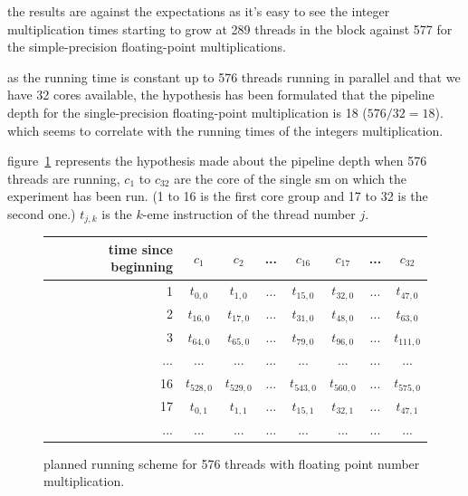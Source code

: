 \documentclass{report}
\begin{document}
    the results are against the expectations as it's easy to see the integer
    multiplication times starting to grow at 289 threads in the block against
    577 for the simple-precision floating-point multiplications.
    
    as the running time is constant up to 576 threads running in parallel and that we have 32 cores
    available, the hypothesis has been formulated that the pipeline depth for the single-precision 
    floating-point multiplication is 18 ($576/32 = 18$). which seems to correlate with the running
    times of the integers multiplication. 
    
    figure~\ref{fig:fp_prediction_512}
    represents the hypothesis made about the pipeline depth when 576 threads are running, $c_1$ to
    $c_{32}$ are the core of the single sm on which the experiment has been run. (1 to 16 is the
    first core group and 17 to 32 is the second one.) $t_{j,k}$ is the $k$-eme instruction of the thread number $j$. 
        \begin{figure}[h]
      \centering
       \begin{tabular}{ | r || c | c | c | c || c | c | c | }
    	    \hline
    	    time since beginning & $c_1$ & $c_2$ & ... & $c_{16}$ & $c_{17}$ & ... & $c_{32}$ \\ \hline  \hline
    	   1 & $t_{0,0}$ & $t_{1,0}$ & ... & $t_{15,0}$ & $t_{32, 0}$ & ... & $t_{47, 0}$ \\ \hline 
    	   2 & $t_{16,0}$ & $t_{17,0}$ & ... & $t_{31,0}$ & $t_{48, 0}$ & ... & $t_{63, 0}$ \\ \hline
    	   3 & $t_{64,0}$ & $t_{65,0}$ & ... & $t_{79,0}$ & $t_{96, 0}$ & ... & $t_{111, 0}$ \\ \hline
    	   ... & ... & ... & ... & ... & ... & ... & ... \\ \hline
    	   16 & $t_{528,0}$ & $t_{529,0}$ & ... & $t_{543,0}$ & $t_{560,0}$ & ... & $t_{575, 0}$ \\ \hline
    	   17 & $t_{0,1}$ & $t_{1,1}$ & ... & $t_{15,1}$ & $t_{32, 1}$ & ... & $t_{47, 1}$ \\ \hline
    	   ... & ... & ... & ... & ... & ... & ... & ... \\ \hline
  	\end{tabular}
  	\captionsetup{justification=centering}
  	\caption{planned running scheme for 576 threads with floating point number multiplication.}
  	\label{fig:fp_prediction_512}
   \end{figure}
   
\end{document}
